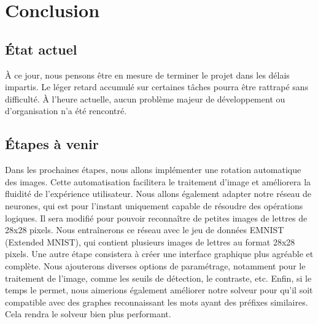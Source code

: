 \section{Conclusion}
\subsection{État actuel}
\indent À ce jour, nous pensons être en mesure de terminer le projet dans les délais impartis. Le léger retard accumulé sur certaines tâches pourra être rattrapé sans difficulté. À l’heure actuelle, aucun problème majeur de développement ou d’organisation n'a été rencontré.

\subsection{Étapes à venir}
\indent Dans les prochaines étapes, nous allons implémenter une rotation automatique des images. Cette automatisation facilitera le traitement d’image et améliorera la fluidité de l’expérience utilisateur. \newline 
Nous allons également adapter notre réseau de neurones, qui est pour l’instant uniquement capable de résoudre des opérations logiques. Il sera modifié pour pouvoir reconnaître de petites images de lettres de 28x28 pixels. Nous entraînerons ce réseau avec le jeu de données EMNIST (Extended MNIST), qui contient plusieurs images de lettres au format 28x28 pixels. \newline
Une autre étape consistera à créer une interface graphique plus agréable et complète. Nous ajouterons diverses options de paramétrage, notamment pour le traitement de l’image, comme les seuils de détection, le contraste, etc. \newline
Enfin, si le temps le permet, nous aimerions également améliorer notre solveur pour qu'il soit compatible avec des graphes reconnaissant les mots ayant des préfixes similaires. Cela rendra le solveur bien plus performant.
